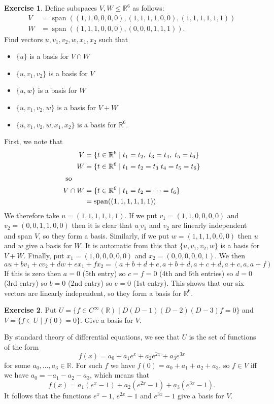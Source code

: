 \documentclass{amsart}
\newcommand{\R}         {{\mathbb{R}}}
\newcommand{\st}        {\;|\;}
\newcommand{\spn}       {\operatorname{span}}
\renewcommand{\:}{\colon}
\theoremstyle{definition}
\newtheorem{exercise}{Exercise}
\newenvironment{solution}{{\noindent \bf Solution:}}{}
\begin{document}
\begin{exercise}
 Define subspaces $V,W\leq\R^6$ as follows:
 \begin{align*}
  V &= \spn((1,1,0,0,0,0),(1,1,1,1,0,0),(1,1,1,1,1,1)) \\
  W &= \spn((1,1,1,0,0,0),(0,0,0,1,1,1)).
 \end{align*}
 Find vectors $u,v_1,v_2,w,x_1,x_2$ such that 
 \begin{itemize}
  \item $\{u\}$ is a basis for $V\cap W$
  \item $\{u,v_1,v_2\}$ is a basis for $V$
  \item $\{u,w\}$ is a basis for $W$
  \item $\{u,v_1,v_2,w\}$ is a basis for $V+W$
  \item $\{u,v_1,v_2,w,x_1,x_2\}$ is a basis for $\R^6$.
 \end{itemize}
\end{exercise}
\begin{solution}
 First, we note that
 \begin{align*}
  V &= \{t\in\R^6\st t_1=t_2,\; t_3=t_4,\; t_5=t_6\} \\
  W &= \{t\in\R^6\st t_1=t_2=t_3\; t_4=t_5=t_6\} \\
 \intertext{ so } 
  V\cap W &= \{t\in\R^6\st t_1=t_2=\dotsb=t_6\} \\
   &= \spn((1,1,1,1,1,1))
 \end{align*}
 We therefore take $u=(1,1,1,1,1,1)$.  If we put
 $v_1=(1,1,0,0,0,0)$ and $v_2=(0,0,1,1,0,0)$ then it is
 clear that $u_,v_1$ and $v_2$ are linearly independent and
 span $V$, so they form a basis.  Similarly, if we put
 $w=(1,1,1,0,0,0)$ then $u$ and $w$ give a basis for $W$.
 It is automatic from this that $\{u,v_1,v_2,w\}$ is a basis
 for $V+W$.  Finally, put $x_1=(1,0,0,0,0,0)$ and
 $x_2=(0,0,0,0,0,1)$.  We then 
 \[ au+bv_1+cv_2+dw+ex_1+fx_2 = 
    (a+b+d+e,a+b+d,a+c+d,a+c,a,a+f)
 \]
 If this is zero then $a=0$ (5th entry) so $c=f=0$ (4th and
 6th entries) so $d=0$ (3rd entry) so $b=0$ (2nd entry) so
 $e=0$ (1st entry).  This shows that our six vectors are
 linearly independent, so they form a basis for $\R^6$.
\end{solution}


\begin{exercise}
 Put $U=\{f\in C^\infty(\R)\st D(D-1)(D-2)(D-3)f=0\}$ and
 $V=\{f\in U\st f(0)=0\}$.  Give a basis for $V$. 
\end{exercise}
\begin{solution}
 By standard theory of differential equations, we see that
 $U$ is the set of functions of the form 
 \[ f(x) = a_0 + a_1e^x + a_2e^{2x} + a_3e^{3x} \]
 for some $a_0,\dotsc,a_3\in\R$.  For such $f$ we have
 $f(0)=a_0+a_1+a_2+a_3$, so $f\in V$ iff we have
 $a_0=-a_1-a_2-a_3$, which means that 
 \[ f(x) = a_1(e^x-1) + a_2(e^{2x}-1) + a_3(e^{3x}-1). \]
 It follows that the functions $e^x-1$, $e^{2x}-1$ and
 $e^{3x}-1$ give a basis for $V$.
\end{solution}
\end{document}
